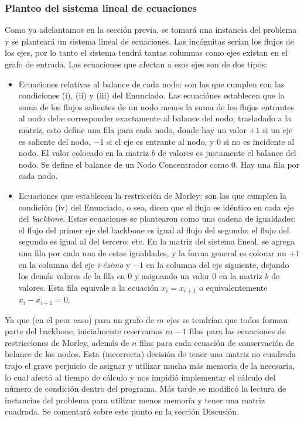 \subsubsection{Planteo del sistema lineal de ecuaciones}

Como ya adelantamos en la secci\'on previa, se tomar\'a una instancia del problema y se plantear\'a un sistema lineal de ecuaciones.
Las inc\'ognitas ser\'ian los flujos de los ejes, por lo tanto el sistema tendr\'a tantas columnas como ejes existan en el grafo de entrada.
Las ecuaciones que afectan a esos ejes son de dos tipos:
\begin{itemize}
\item Ecuaciones relativas al balance de cada nodo: son las que cumplen con las condiciones (i), (ii) y (iii) del Enunciado. Las ecuaci\'ones establecen que la suma de los flujos salientes de un nodo menos la suma de los flujos entrantes al nodo debe corresponder exactamente al balance del nodo; trasladado a la matriz, esto define una fila para cada nodo, donde hay un valor $+1$ si un eje es saliente del nodo, $-1$ si el eje es entrante al nodo, y $0$ si no es incidente al nodo. El valor colocado en la matriz $b$ de valores es justamente el balance del nodo. Se define el balance de un Nodo Concentrador como $0$. Hay una fila por cada nodo.
\item Ecuaciones que establecen la restricci\'on de Morley: son las que cumplen la condici\'on (iv) del Enunciado, o sea, dicen que el flujo es id\'entico en cada eje del \emph{backbone}. Estas ecuaciones se plantearon como una cadena de igualdades: el flujo del primer eje del backbone es igual al flujo del segundo; el flujo del segundo es igual al del tercero; etc. En la matriz del sistema lineal, se agrega una fila por cada una de estas igualdades, y la forma general es colocar un $+1$ en la columna del eje \emph{i-\'esimo} y $-1$ en la columna del eje siguiente, dejando los dem\'as valores de la fila en $0$ y asignando un valor $0$ en la matriz $b$ de valores. Esta fila equivale a la ecuaci\'on $x_i = x_{i+1}$ o equivalentemente $x_i - x_{i+1} = 0$.
\end{itemize}
Ya que (en el peor caso) para un grafo de $m$ ejes se tendr\'ian que todos forman parte del backbone, inicialmente reservamos $m-1$ filas para las ecuaciones de restricciones de Morley, adem\'as de $n$ filas para cada ecuaci\'on de conservaci\'on de balance de los nodos. Esta (incorrecta) decisi\'on de tener una matriz no cuadrada trajo el grave perjuicio de asignar y utilizar mucha m\'as memoria de la necesaria, lo cual afect\'o al tiempo de c\'alculo y nos impidi\'o implementar el c\'alculo del n\'umero de condici\'on dentro del programa. M\'as tarde se modific\'o la lectura de instancias del problema para utilizar menos memoria y tener una matriz cuadrada. Se comentar\'a sobre este punto en la secci\'on Discusi\'on.

